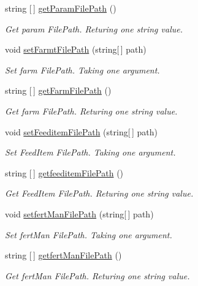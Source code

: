 \begin{DoxyCompactItemize}
string \mbox{[}$\,$\mbox{]} \mbox{\hyperlink{class_global_vars_a07f6f253145eaf5be0d60004cc5eddaa}{get\+Param\+File\+Path}} ()
\begin{DoxyCompactList}\small\item\em Get param File\+Path. Returing one string value. \end{DoxyCompactList}\item 
void \mbox{\hyperlink{class_global_vars_a6467ce1bbcd14765a635d91f4e6618d5}{set\+Farmt\+File\+Path}} (string\mbox{[}$\,$\mbox{]} path)
\begin{DoxyCompactList}\small\item\em Set farm File\+Path. Taking one argument. \end{DoxyCompactList}\item 
string \mbox{[}$\,$\mbox{]} \mbox{\hyperlink{class_global_vars_aacdedef4c3e5f5c56f847d2b27df7c6c}{get\+Farm\+File\+Path}} ()
\begin{DoxyCompactList}\small\item\em Get farm File\+Path. Returing one string value. \end{DoxyCompactList}\item 
void \mbox{\hyperlink{class_global_vars_a6ca2fb796401a8ef3d42042c2e60a773}{set\+Feeditem\+File\+Path}} (string\mbox{[}$\,$\mbox{]} path)
\begin{DoxyCompactList}\small\item\em Set Feed\+Item File\+Path. Taking one argument. \end{DoxyCompactList}\item 
string \mbox{[}$\,$\mbox{]} \mbox{\hyperlink{class_global_vars_a3e9bd776f13ec83a538a37aa89438499}{getfeeditem\+File\+Path}} ()
\begin{DoxyCompactList}\small\item\em Get Feed\+Item File\+Path. Returing one string value. \end{DoxyCompactList}\item 
void \mbox{\hyperlink{class_global_vars_aed3b5ff219e7de5d3b559f94b5c6a6a3}{setfert\+Man\+File\+Path}} (string\mbox{[}$\,$\mbox{]} path)
\begin{DoxyCompactList}\small\item\em Set fert\+Man File\+Path. Taking one argument. \end{DoxyCompactList}\item 
string \mbox{[}$\,$\mbox{]} \mbox{\hyperlink{class_global_vars_a42b557435cac90388444da5e97b5f7a7}{getfert\+Man\+File\+Path}} ()
\begin{DoxyCompactList}\small\item\em Get fert\+Man File\+Path. Returing one string value. \end{DoxyCompactList}\item 

\end{DoxyCompactItemize}
